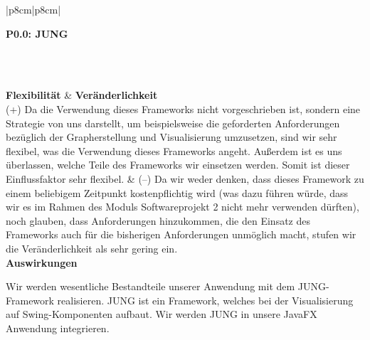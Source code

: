 \documentclass[enabledeprecatedfontcommands,fontsize=11pt,paper=a4,twoside]{scrartcl}
\newcounter{one}
\newcounter{two}[one]
\newcommand{\tone}{0\theone}
\newcommand{\two}{\stepcounter{two}0\thetwo}
\begin{document}
\begin{tabular} {|p{8cm}|p{8cm}|}
	\hline
	 {\parbox{16cm}{\textbf{\hypertarget{k}{P\tone.\two}: JUNG }} } \\ \hline\hline 
	\rule{0pt}{9ex}\\ [3ex] \hline
	\textbf{Flexibilität}  & \textbf{Veränderlichkeit} \\
	(+) Da die Verwendung dieses Frameworks nicht vorgeschrieben ist, sondern eine Strategie von uns darstellt, um beispielsweise die geforderten Anforderungen bezüglich der Grapherstellung und Visualisierung umzusetzen, sind wir sehr flexibel, was die Verwendung dieses Frameworks angeht. Außerdem ist es uns überlassen, welche Teile des Frameworks wir einsetzen werden. Somit ist dieser Einflussfaktor sehr flexibel. & 
	(--) Da wir weder denken, dass dieses Framework zu einem beliebigem Zeitpunkt kostenpflichtig wird (was dazu führen würde, dass wir es im Rahmen des Moduls Softwareprojekt 2 nicht mehr verwenden dürften), noch glauben, dass Anforderungen hinzukommen, die den Einsatz des Frameworks auch für die bisherigen Anforderungen unmöglich macht, stufen wir die Veränderlichkeit als sehr gering ein. \\
	\hline
	 {\textbf{Auswirkungen}} \\
	 {\parbox{16cm}{Wir werden wesentliche Bestandteile unserer Anwendung mit dem JUNG-Framework realisieren. JUNG ist ein Framework, welches bei der Visualisierung auf Swing-Komponenten aufbaut. Wir werden JUNG in unsere JavaFX Anwendung integrieren. } }\\ \hline
\end{tabular}
\end{document}
